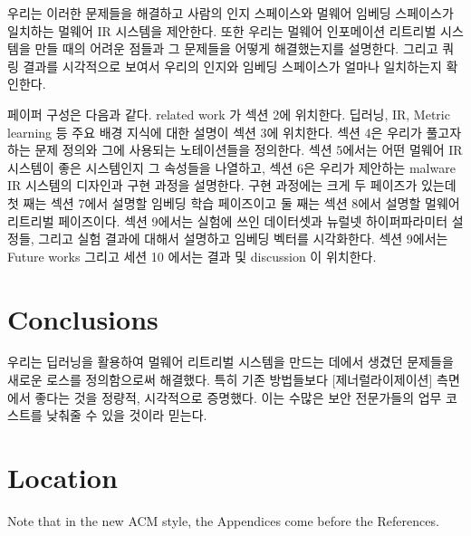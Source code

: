 우리는 이러한 문제들을 해결하고 사람의 인지 스페이스와 멀웨어 임베딩 스페이스가 일치하는 멀웨어 IR 시스템을 제안한다. 또한 우리는 멀웨어 인포메이션 리트리벌 시스템을 만들 때의 어려운 점들과 그 문제들을 어떻게 해결했는지를 설명한다. 그리고 쿼링 결과를 시각적으로 보여서 우리의 인지와 임베딩 스페이스가 얼마나 일치하는지 확인한다. %

페이퍼 구성은 다음과 같다. related work 가 섹션 2에 위치한다. 딥러닝, IR, Metric learning 등 주요 배경 지식에 대한 설명이 섹션 3에 위치한다. 섹션 4은 우리가 풀고자하는 문제 정의와 그에 사용되는 노테이션들을 정의한다. 섹션 5에서는 어떤 멀웨어 IR 시스템이 좋은 시스템인지 그 속성들을 나열하고, 섹션 6은 우리가 제안하는 malware IR 시스템의 디자인과 구현 과정을 설명한다. 구현 과정에는 크게 두 페이즈가 있는데 첫 째는 섹션 7에서 설명할 임베딩 학습 페이즈이고 둘 째는 섹션 8에서 설명할 멀웨어 리트리벌 페이즈이다. 섹션 9에서는 실험에 쓰인 데이터셋과 뉴럴넷 하이퍼파라미터 설정들, 그리고 실험 결과에 대해서 설명하고 임베딩 벡터를 시각화한다. 섹션 9에서는 Future works 그리고 세션 10 에서는 결과 및 discussion 이 위치한다. 













\section{Conclusions}

우리는 딥러닝을 활용하여 멀웨어 리트리벌 시스템을 만드는 데에서 생겼던 문제들을 새로운 로스를 정의함으로써 해결했다. 특히 기존 방법들보다 [제너럴라이제이션] 측면에서 좋다는 것을 정량적, 시각적으로 증명했다. 이는 수많은 보안 전문가들의 업무 코스트를 낮춰줄 수 있을 것이라 믿는다.

\appendix

\section{Location}

Note that in the new ACM style, the Appendices come before the References.


\begin{acks}
\end{acks}
